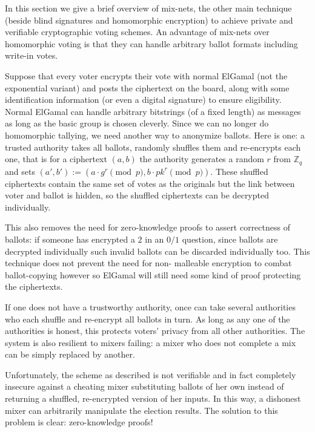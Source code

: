 \documentclass[envcountsame]{llncs}
\begin{document}
In this section we give a brief overview of mix-nets, the other main technique
(beside blind signatures and homomorphic encryption) to achieve private and
verifiable cryptographic voting schemes. An advantage of mix-nets over
homomorphic voting is that they can handle arbitrary ballot formats including
write-in votes.

Suppose that every voter encrypts their vote with normal ElGamal (not the
exponential variant) and posts the ciphertext on the board, along with some
identification information (or even a digital signature) to ensure eligibility.
Normal ElGamal can handle arbitrary bitstrings (of a fixed length) as messages
as long as the basic group is chosen cleverly\footnotemark.
Since we can no longer do homomorphic tallying, we need another way to anonymize
ballots. Here is one: a trusted authority takes all ballots, randomly shuffles
them and re-encrypts each one, that is for a ciphertext $(a, b)$ the authority
generates a random $r$ from $\mathbb Z_q$ and sets
$(a', b') := (a \cdot g^r \pmod{p}, b \cdot pk^r \pmod{p})$.
These shuffled ciphertexts contain the same set of votes as the originals but
the link between voter and ballot is hidden, so the shuffled ciphertexts can be
decrypted individually.

This also removes the need for zero-knowledge proofs to assert correctness of
ballots: if someone has encrypted a $2$ in an $0/1$ question, since ballots are
decrypted individually such invalid ballots can be discarded individually too.
This technique does not prevent the need for non- malleable encryption to combat
ballot-copying however so ElGamal will still need some kind of proof protecting
the ciphertexts.

If one does not have a trustworthy authority, once can take several authorities
who each shuffle and re-encrypt all ballots in turn. As long as any one of the
authorities is honest, this protects voters' privacy from all other authorities.
The system is also resilient to mixers failing: a mixer who does not complete a
mix can be simply replaced by another.

Unfortunately, the scheme as described is not verifiable and in fact completely
insecure against a cheating mixer substituting ballots of her own instead of
returning a shuffled, re-encrypted version of her inputs. In this way, a
dishonest mixer can arbitrarily manipulate the election results. The solution to
this problem is clear: zero-knowledge proofs!
\end{document}
